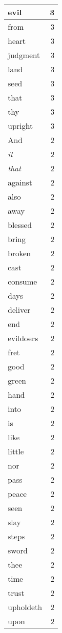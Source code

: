 \begin{center}
\begin{longtable}{l|r}
evil & 3 \\ \hline
from & 3 \\ \hline
heart & 3 \\ \hline
judgment & 3 \\ \hline
land & 3 \\ \hline
seed & 3 \\ \hline
that & 3 \\ \hline
thy & 3 \\ \hline
upright & 3 \\ \hline
And & 2 \\ \hline
\emph{it} & 2 \\ \hline
\emph{that} & 2 \\ \hline
against & 2 \\ \hline
also & 2 \\ \hline
away & 2 \\ \hline
blessed & 2 \\ \hline
bring & 2 \\ \hline
broken & 2 \\ \hline
cast & 2 \\ \hline
consume & 2 \\ \hline
days & 2 \\ \hline
deliver & 2 \\ \hline
end & 2 \\ \hline
evildoers & 2 \\ \hline
fret & 2 \\ \hline
good & 2 \\ \hline
green & 2 \\ \hline
hand & 2 \\ \hline
into & 2 \\ \hline
is & 2 \\ \hline
like & 2 \\ \hline
little & 2 \\ \hline
nor & 2 \\ \hline
pass & 2 \\ \hline
peace & 2 \\ \hline
seen & 2 \\ \hline
slay & 2 \\ \hline
steps & 2 \\ \hline
sword & 2 \\ \hline
thee & 2 \\ \hline
time & 2 \\ \hline
trust & 2 \\ \hline
upholdeth & 2 \\ \hline
upon & 2 \\ \hline

\end{longtable}
\end{center}
